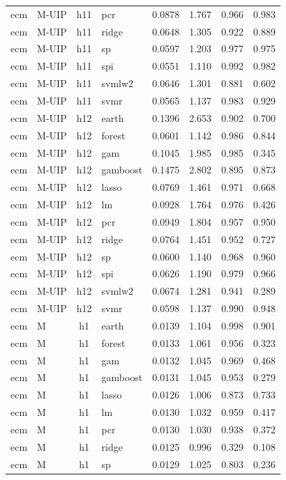 \begin{ThreePartTable}
\begin{longtable}[t]{llclcccc}
ecm & M-UIP & h11 & pcr & 0.0878 & 1.767 & 0.966 & 0.983\\
ecm & M-UIP & h11 & ridge & 0.0648 & 1.305 & 0.922 & 0.889\\
ecm & M-UIP & h11 & sp & 0.0597 & 1.203 & 0.977 & 0.975\\
ecm & M-UIP & h11 & spi & 0.0551 & 1.110 & 0.992 & 0.982\\
ecm & M-UIP & h11 & svmlw2 & 0.0646 & 1.301 & 0.881 & 0.602\\
ecm & M-UIP & h11 & svmr & 0.0565 & 1.137 & 0.983 & 0.929\\
\addlinespace
ecm & M-UIP & h12 & earth & 0.1396 & 2.653 & 0.902 & 0.700\\
ecm & M-UIP & h12 & forest & 0.0601 & 1.142 & 0.986 & 0.844\\
ecm & M-UIP & h12 & gam & 0.1045 & 1.985 & 0.985 & 0.345\\
ecm & M-UIP & h12 & gamboost & 0.1475 & 2.802 & 0.895 & 0.873\\
ecm & M-UIP & h12 & lasso & 0.0769 & 1.461 & 0.971 & 0.668\\
ecm & M-UIP & h12 & lm & 0.0928 & 1.764 & 0.976 & 0.426\\
ecm & M-UIP & h12 & pcr & 0.0949 & 1.804 & 0.957 & 0.950\\
ecm & M-UIP & h12 & ridge & 0.0764 & 1.451 & 0.952 & 0.727\\
ecm & M-UIP & h12 & sp & 0.0600 & 1.140 & 0.968 & 0.960\\
ecm & M-UIP & h12 & spi & 0.0626 & 1.190 & 0.979 & 0.966\\
ecm & M-UIP & h12 & svmlw2 & 0.0674 & 1.281 & 0.941 & 0.289\\
ecm & M-UIP & h12 & svmr & 0.0598 & 1.137 & 0.990 & 0.948\\
\addlinespace
ecm & M & h1 & earth & 0.0139 & 1.104 & 0.998 & 0.901\\
ecm & M & h1 & forest & 0.0133 & 1.061 & 0.956 & 0.323\\
ecm & M & h1 & gam & 0.0132 & 1.045 & 0.969 & 0.468\\
ecm & M & h1 & gamboost & 0.0131 & 1.045 & 0.953 & 0.279\\
ecm & M & h1 & lasso & 0.0126 & 1.006 & 0.873 & 0.733\\
ecm & M & h1 & lm & 0.0130 & 1.032 & 0.959 & 0.417\\
ecm & M & h1 & pcr & 0.0130 & 1.030 & 0.938 & 0.372\\
ecm & M & h1 & ridge & 0.0125 & 0.996 & 0.329 & 0.108\\
ecm & M & h1 & sp & 0.0129 & 1.025 & 0.803 & 0.236\\

\end{longtable}
\end{ThreePartTable}
